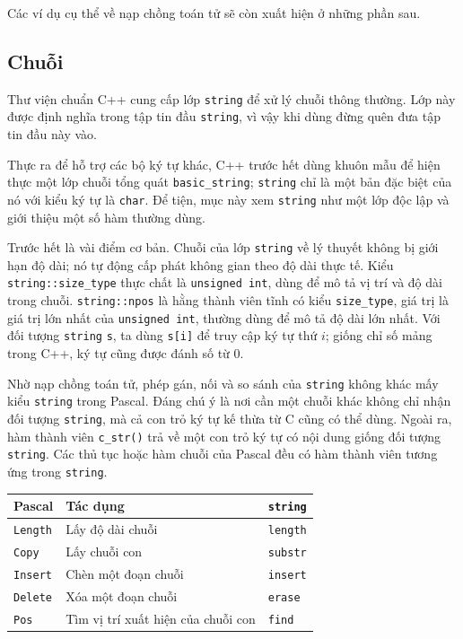 \documentclass[11pt]{article}
\newcommand{\cpp}{C++}
\newcommand{\pascal}{Pascal}
\begin{document}
Các ví dụ cụ thể về nạp chồng toán tử sẽ còn xuất hiện ở những phần sau.

\subsection{Chuỗi}

Thư viện chuẩn \cpp{} cung cấp lớp \verb|string| để xử lý chuỗi thông thường.
Lớp này được định nghĩa trong tập tin đầu \verb|string|, vì vậy khi dùng đừng
quên đưa tập tin đầu này vào.

Thực ra để hỗ trợ các bộ ký tự khác, \cpp{} trước hết dùng khuôn mẫu để hiện
thực một lớp chuỗi tổng quát \verb|basic_string|; \verb|string| chỉ là một bản
đặc biệt của nó với kiểu ký tự là \verb|char|. Để tiện, mục này xem
\verb|string| như một lớp độc lập và giới thiệu một số hàm thường dùng.

Trước hết là vài điểm cơ bản. Chuỗi của lớp \verb|string| về lý thuyết không
bị giới hạn độ dài; nó tự động cấp phát không gian theo độ dài thực tế.
Kiểu \verb|string::size_type| thực chất là \verb|unsigned int|, dùng để mô tả
vị trí và độ dài trong chuỗi. \verb|string::npos| là hằng thành viên tĩnh có
kiểu \verb|size_type|, giá trị là giá trị lớn nhất của \verb|unsigned int|,
thường dùng để mô tả độ dài lớn nhất. Với đối tượng \verb|string| \verb|s|,
ta dùng \verb|s[i]| để truy cập ký tự thứ \(i\); giống chỉ số mảng trong
\cpp{}, ký tự cũng được đánh số từ \(0\).

Nhờ nạp chồng toán tử, phép gán, nối và so sánh của \verb|string| không khác
mấy kiểu \verb|string| trong \pascal{}. Đáng chú ý là nơi cần một chuỗi khác
không chỉ nhận đối tượng \verb|string|, mà cả con trỏ ký tự kế thừa từ C cũng
có thể dùng. Ngoài ra, hàm thành viên \verb|c_str()| trả về một con trỏ ký tự
có nội dung giống đối tượng \verb|string|. Các thủ tục hoặc hàm chuỗi của
\pascal{} đều có hàm thành viên tương ứng trong \verb|string|.

\begin{center}
\begin{tabular}{lll}
\hline
\textbf{\pascal{}} & \textbf{Tác dụng} & \textbf{\texttt{string}}\\
\hline
\verb|Length| & Lấy độ dài chuỗi & \verb|length|\\
\verb|Copy| & Lấy chuỗi con & \verb|substr|\\
\verb|Insert| & Chèn một đoạn chuỗi & \verb|insert|\\
\verb|Delete| & Xóa một đoạn chuỗi & \verb|erase|\\
\verb|Pos| & Tìm vị trí xuất hiện của chuỗi con & \verb|find|\\
\hline
\end{tabular}
\end{center}
\end{document}
